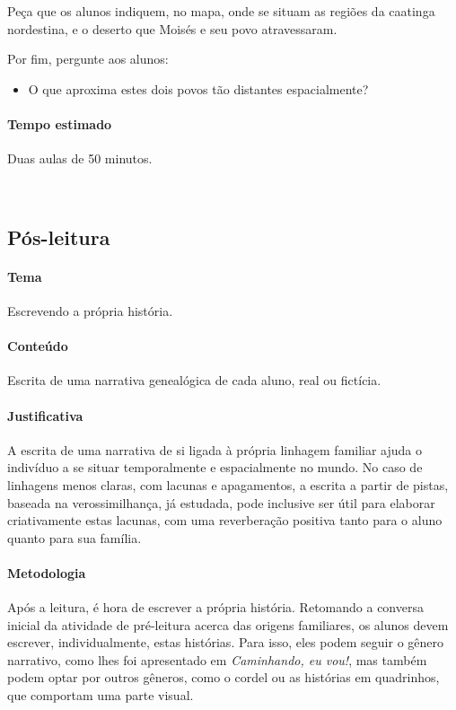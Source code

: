 \documentclass[11pt]{extarticle}
\begin{document}
Peça que os alunos indiquem, no mapa, onde se situam as regiões da 
caatinga nordestina, e o deserto que Moisés e seu povo atravessaram.

Por fim, pergunte aos alunos: 

\begin{itemize}
\item O que aproxima estes dois povos tão distantes espacialmente? 
\end{itemize}


\paragraph{Tempo estimado} Duas aulas de 50 minutos.  

 
\subsection{Pós-leitura}


\paragraph{Tema} Escrevendo a própria história.

\paragraph{Conteúdo} Escrita de uma narrativa genealógica de cada aluno,
real ou fictícia.

\paragraph{Justificativa} A escrita de uma narrativa de si ligada à própria 
linhagem familiar ajuda o indivíduo a se situar temporalmente e espacialmente
no mundo. No caso de linhagens menos claras, com lacunas e apagamentos,
a escrita a partir de pistas, baseada na verossimilhança, já estudada,
pode inclusive ser útil para elaborar criativamente estas lacunas,
com uma reverberação positiva tanto para o aluno quanto para sua família. 

\paragraph{Metodologia} 
Após a leitura, é hora de escrever a própria história.
Retomando a conversa inicial da atividade de pré-leitura
acerca das origens familiares, os alunos devem escrever, 
individualmente, estas histórias. Para isso, eles podem
seguir o gênero narrativo, como lhes foi apresentado em
\textit{Caminhando, eu vou!}, mas também podem optar
por outros gêneros, como o cordel ou as histórias em 
quadrinhos, que comportam uma parte visual. 
\end{document}
